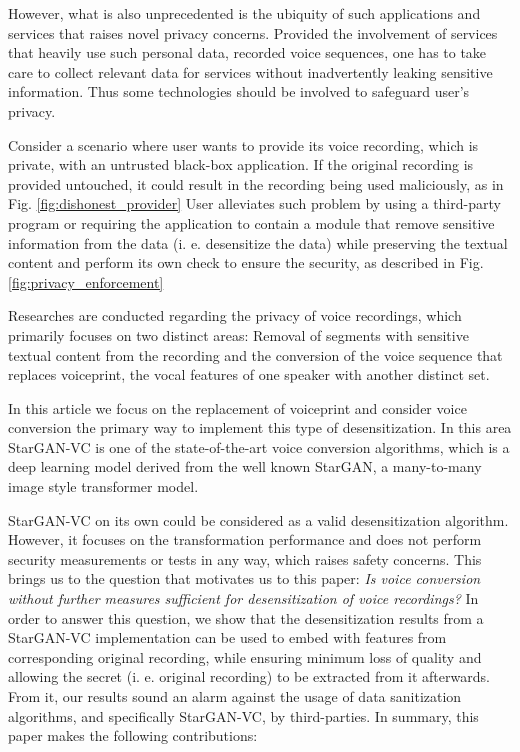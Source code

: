 \documentclass[journal]{IEEEtran} %
\begin{document}
However, what is also unprecedented is the ubiquity of such applications and services that raises novel privacy concerns. Provided the involvement of services that heavily use such personal data, recorded voice sequences, one has to take care to collect relevant data for services without inadvertently leaking sensitive information. Thus some technologies should be involved to safeguard user's privacy.

Consider a scenario where user wants to provide its voice recording, which is private, with an untrusted black-box application. If the original recording is provided untouched, it could result in the recording being used maliciously, as in Fig. \ref{fig:dishonest_provider} User alleviates such problem by using a third-party program or requiring the application to contain a module that remove sensitive information from the data (i. e. desensitize the data) while preserving the textual content and perform its own check to ensure the security, as described in Fig. \ref{fig:privacy_enforcement}

Researches are conducted regarding the privacy of voice recordings, which primarily focuses on two distinct areas: Removal of segments with sensitive textual content from the recording and the conversion of the voice sequence that replaces voiceprint, the vocal features of one speaker with another distinct set.

In this article we focus on the replacement of voiceprint and consider voice conversion the primary way to implement this type of desensitization. In this area StarGAN-VC is one of the state-of-the-art voice conversion algorithms, which is a deep learning model derived from the well known StarGAN, a many-to-many image style transformer model.

StarGAN-VC on its own could be considered as a valid desensitization algorithm. However, it focuses on the transformation performance and does not perform security measurements or tests in any way, which raises safety concerns. This brings us to the question that motivates us to this paper: \textit{Is voice conversion without further measures sufficient for desensitization of voice recordings?} In order to answer this question, we show that the desensitization results from a StarGAN-VC implementation can be used to embed with features from corresponding original recording, while ensuring minimum loss of quality and allowing the secret (i. e. original recording) to be extracted from it afterwards. From it, our results sound an alarm against the usage of data sanitization algorithms, and specifically StarGAN-VC, by third-parties. In summary, this paper makes the following contributions:
\end{document}
